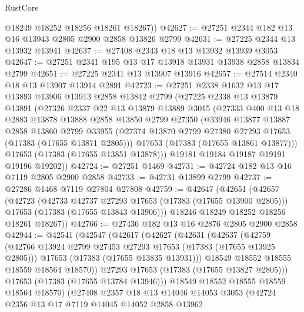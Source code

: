 \begin{lexlean}{RustCore}
\begin{coremodule}
        @18249
        @18252
        @18256
        @18261
        @18267))
@42627 := @27251 @2344 @182 @13 @16 @13943 @2805 @2900 @2858 @13826 @2799
@42631 := @27225 @2344 @13 @13932 @13941
@42637 := @27408 @2343 @18 @13 @13932 @13939 @3053
@42647 := @27251 @2341 @195 @13 @17 @13918 @13931 @13938 @2858 @13834 @2799
@42651 := @27225 @2341 @13 @13907 @13916
@42657 := @27514 @2340 @18 @13 @13907 @13914 @2891
@42723 := @27251
    @2338
    @1632
    @13
    @17
    @13893
    @13906
    @13913
    @2858
    @13842
    @2799
    (@27225
      @2338
      @13
      @13879
      @13891
      (@27326
        @2337
        @22
        @13
        @13879
        @13889
        @3015
        (@27333
          @400
          @13
          @18
          @2883
          @13878
          @13888
          @2858
          @13850
          @2799
          @27350
          (@33946
            @13877
            @13887
            @2858
            @13860
            @2799
            @33955
            (@27374 @13870 @2799 @27380 @27293 @17653 (@17383 (@17655 @13871 @2805)))
            @17653
            (@17383 (@17655 @13861 @13877)))
          @17653
          (@17383 (@17655 @13851 @13878)))
        @19181
        @19184
        @19187
        @19191
        @19196
        @19202))
@42724 := @27251 @1469
@42731 := @42724 @182 @13 @16 @7119 @2805 @2900 @2858
@42733 := @42731 @13899 @2799
@42737 := @27286 @1468 @7119 @27804 @27808
@42759 := @42647
    (@42651
      (@42657
        (@42723
          (@42733 @42737 @27293 @17653 (@17383 (@17655 @13900 @2805)))
          @17653
          (@17383 (@17655 @13843 @13906)))
        @18246
        @18249
        @18252
        @18256
        @18261
        @18267))
@42766 := @27436 @182 @13 @16 @2876 @2805 @2900 @2858
@42944 := @42541
    (@42547
      (@42617
        (@42627
          (@42631
            (@42637
              (@42759
                (@42766 @13924 @2799 @27453 @27293 @17653 (@17383 (@17655 @13925 @2805)))
                @17653
                (@17383 (@17655 @13835 @13931)))
              @18549
              @18552
              @18555
              @18559
              @18564
              @18570))
          @27293
          @17653
          (@17383 (@17655 @13827 @2805)))
        @17653
        (@17383 (@17655 @13784 @13946)))
      @18549
      @18552
      @18555
      @18559
      @18564
      @18570)
    (@27408
      @2357
      @18
      @13
      @14046
      @14053
      @3053
      (@42724
        @2356
        @13
        @17
        @7119
        @14045
        @14052
        @2858
        @13962

\end{coremodule}
\end{lexlean}
